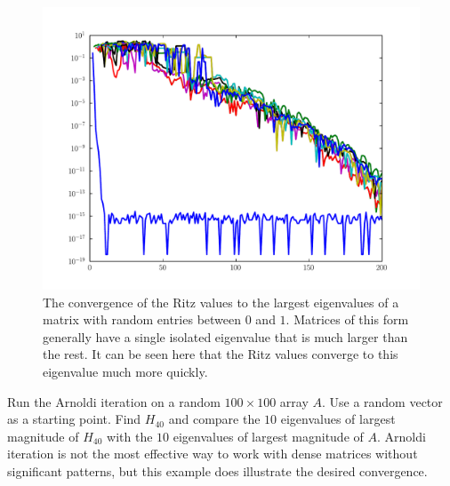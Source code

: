 \begin{figure}
\includegraphics[width=\textwidth]{rand_vals_conv.pdf}
\caption{The convergence of the Ritz values to the largest eigenvalues of a matrix with random entries between $0$ and $1$.
Matrices of this form generally have a single isolated eigenvalue that is much larger than the rest.
It can be seen here that the Ritz values converge to this eigenvalue much more quickly.}
\label{fig:arnoldi_random_val_conv}
\end{figure}

\begin{problem}
Run the Arnoldi iteration on a random $100 \times 100$ array $A$.
Use a random vector as a starting point.
Find $H_{40}$ and compare the $10$ eigenvalues of largest magnitude of $H_{40}$ with the $10$ eigenvalues of largest magnitude of $A$.
Arnoldi iteration is not the most effective way to work with dense matrices without significant patterns, but this example does illustrate the desired convergence.
\end{problem}


